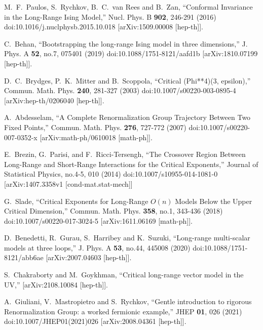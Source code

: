 \documentclass[aps,amsmath,amssymb,prd,showpacs,floatfix,preprint,superscriptaddress,nofootinbib,12pt]{article}
\begin{document}
\begin{thebibliography}{99}
M.~F.~Paulos, S.~Rychkov, B.~C.~van Rees and B.~Zan,
``Conformal Invariance in the Long-Range Ising Model,''
Nucl. Phys. B \textbf{902}, 246-291 (2016)
doi:10.1016/j.nuclphysb.2015.10.018
[arXiv:1509.00008 [hep-th]].

C.~Behan,
``Bootstrapping the long-range Ising model in three dimensions,''
J. Phys. A \textbf{52}, no.7, 075401 (2019)
doi:10.1088/1751-8121/aafd1b
[arXiv:1810.07199 [hep-th]].

D.~C.~Brydges, P.~K.~Mitter and B.~Scoppola,
``Critical (Phi**4)(3, epsilon),''
Commun. Math. Phys. \textbf{240}, 281-327 (2003)
doi:10.1007/s00220-003-0895-4
[arXiv:hep-th/0206040 [hep-th]].

A.~Abdesselam,
``A Complete Renormalization Group Trajectory Between Two Fixed Points,''
Commun. Math. Phys. \textbf{276}, 727-772 (2007)
doi:10.1007/s00220-007-0352-x
[arXiv:math-ph/0610018 [math-ph]].

E.~Brezin, G.~Parisi, and F.~Ricci-Tersengh,
``The Crossover Region Between
  Long-Range and Short-Range Interactions for the Critical Exponents,''
Journal of
  Statistical Physics, no.4-5, 010 (2014)
doi:10.1007/s10955-014-1081-0
[arXiv:1407.3358v1 [cond-mat.stat-mech]]

G.~Slade,
``Critical Exponents for Long-Range ${O(n)}$ Models Below the Upper Critical Dimension,''
Commun. Math. Phys. \textbf{358}, no.1, 343-436 (2018)
doi:10.1007/s00220-017-3024-5
[arXiv:1611.06169 [math-ph]].

D.~Benedetti, R.~Gurau, S.~Harribey and K.~Suzuki,
``Long-range multi-scalar models at three loops,''
J. Phys. A \textbf{53}, no.44, 445008 (2020)
doi:10.1088/1751-8121/abb6ae
[arXiv:2007.04603 [hep-th]].

S.~Chakraborty and M.~Goykhman,
``Critical long-range vector model in the UV,''
[arXiv:2108.10084 [hep-th]].

A.~Giuliani, V.~Mastropietro and S.~Rychkov,
``Gentle introduction to rigorous Renormalization Group: a worked fermionic example,''
JHEP \textbf{01}, 026 (2021)
doi:10.1007/JHEP01(2021)026
[arXiv:2008.04361 [hep-th]].


\end{thebibliography}
\end{document}
